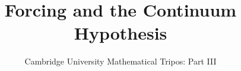 \documentclass{article}
\title{Forcing and the Continuum Hypothesis}
\author{Cambridge University Mathematical Tripos: Part III}
\begin{document}
\maketitle

\tableofcontentsnewpage{}

% 
\end{document}
